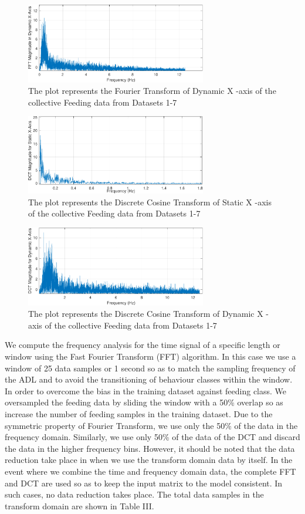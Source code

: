 \documentclass[conference]{IEEEtran}
\begin{document}
\begin{figure}[h!]
	\centering
	\includegraphics[width=3.1in]{4_feed_dynamic_fft.pdf}
	\caption{The plot represents the Fourier Transform of Dynamic X -axis of the collective Feeding data from Datasets 1-7}
	\label{dynamic}
\end{figure}
\begin{figure}[h!]
	\centering
	\includegraphics[width=3.1in]{5_feed_static_dct.pdf}
	\caption{The plot represents the Discrete Cosine Transform of Static X -axis of the collective Feeding data from Datasets 1-7}
	\label{dynamic}
\end{figure}
\begin{figure}[h!]
	\centering
	\includegraphics[width=3.1in]{6_feed_dynamic_dct.pdf}
	\caption{The plot represents the Discrete Cosine Transform of Dynamic X -axis of the collective Feeding data from Datasets 1-7}
	\label{dynamic}
\end{figure}
We compute the frequency analysis for the time signal of a specific length or window using the Fast Fourier Transform (FFT) algorithm. In this case we use a window of 25 data samples or 1 second so as to match the sampling frequency of the ADL and to avoid the transitioning of behaviour classes within the window. In order to overcome the bias in the training dataset against feeding class. We oversampled the feeding data by sliding the window with a 50\% overlap \cite{15} so as increase the number of feeding samples in the training dataset. Due to the symmetric property of Fourier Transform, we use only the 50\% of the data in the frequency domain. Similarly, we use only 50\% of the data of the DCT and discard the data in the higher frequency bins. However, it should be noted that the data reduction take place in when we use the transform domain data by itself. In the event where we combine the time and frequency domain data, the complete FFT and DCT are used so as to keep the input matrix to the model consistent. In such cases, no data reduction takes place. The total data samples in the transform domain are shown in Table III.
\end{document}
